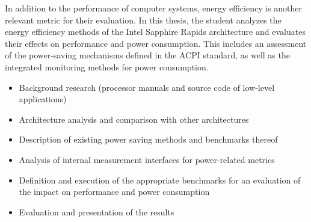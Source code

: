 


\begin{task}[] %
	\minisec{\objectivesname}\smallskip	
In addition to the performance of computer systems, energy efficiency is another relevant metric for their evaluation. In this thesis, the student analyzes the energy efficiency methods of the Intel Sapphire Rapids architecture and evaluates their effects on performance and power consumption. This includes an assessment of the power-saving mechanisms defined in the ACPI standard, as well as the integrated monitoring methods for power consumption.
	
	\minisec{\focusname}\smallskip
	\begin{itemize}
		\item Background research (processor manuals and source code of low-level applications)
		\item Architecture analysis and comparison with other architectures
		\item Description of existing power saving methods and benchmarks thereof
		\item Analysis of internal measurement interfaces for power-related metrics
		\item Definition and execution of the appropriate benchmarks for an evaluation of the impact on performance and power consumption
		\item Evaluation and presentation of the results
	\end{itemize}
\end{task}

